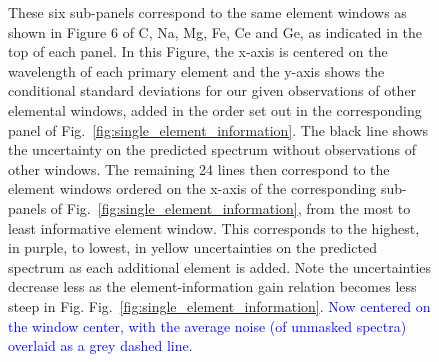 \documentclass[a4paper,fleqn,usenatbib]{mnras}
\begin{document}
\begin{figure}
    \caption{These six sub-panels correspond to the same element windows as shown in Figure 6 of C, Na, Mg, Fe, Ce and Ge, as indicated in the top of each panel. In this Figure, the x-axis is centered on the wavelength of each primary element and the y-axis shows the conditional standard deviations for our  given observations of other elemental windows, added in the order set out in the corresponding panel of Fig.~\ref{fig:single_element_information}. The black line shows the uncertainty on the predicted spectrum without observations of other windows. The remaining 24 lines then correspond to the element windows ordered on the x-axis of the corresponding sub-panels of Fig.~\ref{fig:single_element_information}, from the most to least informative element window. This corresponds to the highest, in purple, to lowest, in yellow uncertainties on the predicted spectrum as each additional element is added. Note the uncertainties decrease less as the element-information gain relation becomes less steep in Fig.  Fig.~\ref{fig:single_element_information}. \textcolor{blue}{Now centered on the window center, with the average noise (of unmasked spectra) overlaid as a grey dashed line.}}
    \label{fig:single_element_errs}
\end{figure}
\end{document}
